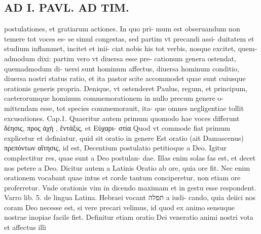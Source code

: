 \documentclass{article}
\begin{document}
\begin{pages}
\section*{AD I. PAVL. AD TIM. }
\marginpar{[ p.42 ]}\pstart postulationes, et gratiarum actiones. In quo pri- mum est obseruandum non temere tot voces es- se simul congestas, sed partim vt precandi assi- duitatem et studium inflammet, incitet et inii- ciat nobis his tot verbis, nosque excitet, quem- admodum dixi: partim vero vt diuersa esse pre- cationum genera ostendat, quemadmodum di- uersi sunt hominum affectus, diuersa hominum conditio, diuersa nostri status ratio, et ita pastor scite accommodet quae sunt cuiusque orationis generis propria. Denique, vt ostenderet Paulus, regum, et principum, caeterorumque hominum commemorationem in nullo precum genere o- mittendam esse, tot species commemorauit, ita- que omnes negligentiae tollit excusationes. Cap.1. Quaeritur autem primum quomodo hae voces differunt δέησις, προς ἀχὴ  , ἔντάξις, et Εὐχαρι- στία Quod vt commode fiat primum explicetur et definiatur, quid sit oratio in genere Est oratio (ait Damascenus) πρεπόντων αἴτησις, id est, Decentium postulatio petitioque a Deo. Igitur complectitur res, quae sunt a Deo postulan- dae. Illas enim solas fas est, et decet nos petere a Deo. Dicitur autem a Latinis Oratio ab ore, quia ore fit. Nec enim orationem vocabant quae intus et corde tantum conciperetur, non etiam ore proferretur. Vnde orationis vim in dicendo maximam et in gestu esse respondent. Varro lib.  5. de lingua Latina. Hebraei vocant תפלה a iudi- cando, quia deiici nos coram Deo necesse est, si vere precari velimus, id quod ex animo sensuque nostrae inopiae facile fiet. Definitur etiam oratio Dei veneratio animi nostri vota et affectus illi  \pend

\end{pages}
\end{document}
